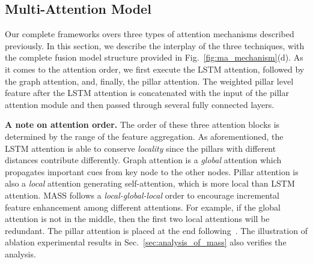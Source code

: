 \documentclass[lettersize,journal]{IEEEtran}
\begin{document}
\subsection{Multi-Attention Model}
Our complete frameworks overs three types of attention mechanisms described previously.
In this section, we describe the interplay of the three techniques, with the complete fusion model structure provided in Fig.~\ref{fig:ma_mechanism}(d).
As it comes to the attention order, we first execute the LSTM attention, followed by the graph attention, and, finally, the pillar attention.
The weighted pillar level feature after the LSTM attention is concatenated with the input of the pillar attention module and then passed through several fully connected layers.

\textbf{A note on attention order.} The order of these three attention blocks is determined by the range of the feature aggregation. As aforementioned, the LSTM attention is able to conserve \textit{locality} since the pillars with different distances contribute differently. Graph attention is a \textit{global} attention which propagates important cues from key node to the other nodes. Pillar attention is also a \textit{local} attention generating self-attention, which is more local than LSTM attention. MASS follows a \textit{local-global-local} order to encourage incremental feature enhancement among different attentions. For example, if the global attention is not in the middle, then the first two local attentions will be redundant. The pillar attention is placed at the end following~\cite{tanet}.
The illustration of ablation experimental results in Sec.~\ref{sec:analysis_of_mass} also verifies the analysis.
\end{document}
